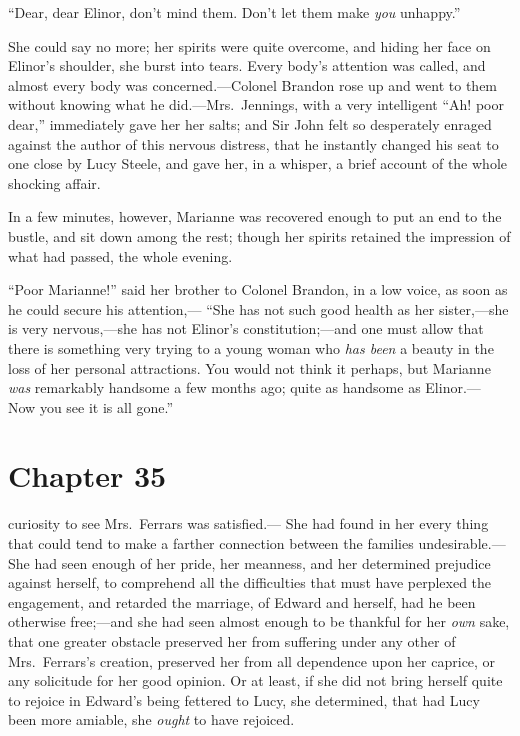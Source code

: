 ``Dear, dear Elinor, don't mind them.  Don't let them
make \emph{you} unhappy.''

She could say no more; her spirits were quite overcome,
and hiding her face on Elinor's shoulder, she burst
into tears.  Every body's attention was called, and almost
every body was concerned.---Colonel Brandon rose up and went
to them without knowing what he did.---Mrs.\ Jennings,
with a very intelligent ``Ah! poor dear,'' immediately gave
her her salts; and Sir John felt so desperately enraged
against the author of this nervous distress, that he
instantly changed his seat to one close by Lucy Steele,
and gave her, in a whisper, a brief account of the whole
shocking affair.

In a few minutes, however, Marianne was recovered
enough to put an end to the bustle, and sit down among
the rest; though her spirits retained the impression
of what had passed, the whole evening.

``Poor Marianne!'' said her brother to Colonel Brandon,
in a low voice, as soon as he could secure his attention,---%
``She has not such good health as her sister,---she is very
nervous,---she has not Elinor's constitution;---and one must
allow that there is something very trying to a young woman
who \emph{has been} a beauty in the loss of her personal attractions.
You would not think it perhaps, but Marianne \emph{was} remarkably
handsome a few months ago; quite as handsome as Elinor.---%
Now you see it is all gone.''



\chapter{Chapter 35}


 curiosity to see Mrs.\ Ferrars was satisfied.---%
She had found in her every thing that could tend to make
a farther connection between the families undesirable.---%
She had seen enough of her pride, her meanness, and her
determined prejudice against herself, to comprehend all
the difficulties that must have perplexed the engagement,
and retarded the marriage, of Edward and herself, had he been
otherwise free;---and she had seen almost enough to be thankful
for her \emph{own} sake, that one greater obstacle preserved her
from suffering under any other of Mrs.\ Ferrars's creation,
preserved her from all dependence upon her caprice, or any
solicitude for her good opinion.  Or at least, if she did not
bring herself quite to rejoice in Edward's being fettered
to Lucy, she determined, that had Lucy been more amiable,
she \emph{ought} to have rejoiced.

